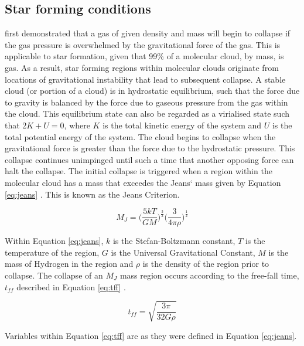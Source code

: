 \documentclass{report}
\begin{document}
\subsection{Star forming conditions} \label{sec:conditions}
\textcite{jeans} first demonstrated that a gas of given density and mass will begin to collapse if the gas pressure is overwhelmed by the gravitational force of the gas. This is applicable to star formation, given that 99\% of a molecular cloud, by mass, is gas. As a result, star forming regions within molecular clouds originate from locations of gravitational instability that lead to subsequent collapse. A stable cloud (or portion of a cloud) is in hydrostatic equilibrium, such that the force due to gravity is balanced by the force due to gaseous pressure from the gas within the cloud. This equilibrium state can also be regarded as a virialised state such that $2K+U=0$, where $K$ is the total kinetic energy of the system and $U$ is the total potential energy of the system. The cloud begins to collapse when the gravitational force is greater than the force due to the hydrostatic pressure. This collapse continues unimpinged until such a time that another opposing force can halt the collapse. The initial collapse is triggered when a region within the molecular cloud has a mass that exceedes the Jeans` mass given by Equation \ref{eq:jeans} \parencite{lecture}. This is known as the Jeans Criterion.

\begin{equation}\label{eq:jeans}
  M_{J} = \Bigg( \frac{5kT}{GM} \Bigg )^\frac{3}{2} \Bigg( \frac{3}{4\pi\rho} \Bigg )^\frac{1}{2}
\end{equation}

Within Equation \ref{eq:jeans}, $k$ is the Stefan-Boltzmann constant, $T$ is the temperature of the region, $G$ is the Universal Gravitational Constant, $M$ is the mass of Hydrogen in the region and $\rho$ is the density of the region prior to collapse. The collapse of an $M_{J}$ mass region occurs according to the free-fall time, $t_{ff}$ described in Equation \ref{eq:tff} \parencite{jeans}.

\begin{equation}\label{eq:tff}
  t_{ff} = \sqrt{\frac{3\pi}{32G\rho}}
\end{equation}

Variables within Equation \ref{eq:tff} are as they were defined in Equation \ref{eq:jeans}.
\end{document}
